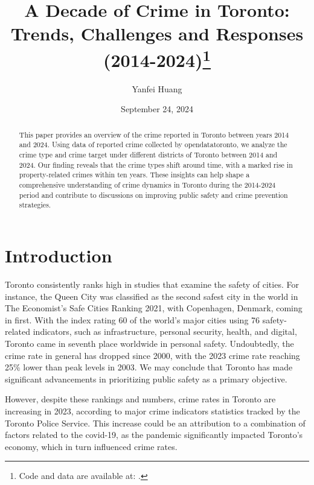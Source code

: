 \documentclass[
  letterpaper,
  DIV=11,
  numbers=noendperiod]{scrartcl}
\title{A Decade of Crime in Toronto: Trends, Challenges and Responses
(2014-2024)\thanks{Code and data are available at: .}}
\author{Yanfei Huang}
\date{September 24, 2024}
\begin{document}
\maketitle
\begin{abstract}
This paper provides an overview of the crime reported in Toronto between
years 2014 and 2024. Using data of reported crime collected by
opendatatoronto, we analyze the crime type and crime target under
different districts of Toronto between 2014 and 2024. Our finding
reveals that the crime types shift around time, with a marked rise in
property-related crimes within ten years. These insights can help shape
a comprehensive understanding of crime dynamics in Toronto during the
2014-2024 period and contribute to discussions on improving public
safety and crime prevention strategies.
\end{abstract}
\ifdefined\Shaded\renewenvironment{Shaded}{\begin{tcolorbox}[borderline west={3pt}{0pt}{shadecolor}, frame hidden, interior hidden, sharp corners, enhanced, breakable, boxrule=0pt]}{\end{tcolorbox}}\fi

\hypertarget{introduction}{%
\section{Introduction}\label{introduction}}

Toronto consistently ranks high in studies that examine the safety of
cities. For instance, the Queen City was classified as the second safest
city in the world in The Economist's Safe Cities Ranking 2021, with
Copenhagen, Denmark, coming in first. With the index rating 60 of the
world's major cities using 76 safety-related indicators, such as
infrastructure, personal security, health, and digital, Toronto came in
seventh place worldwide in personal safety. Undoubtedly, the crime rate
in general has dropped since 2000, with the 2023 crime rate reaching
25\% lower than peak levels in 2003. We may conclude that Toronto has
made significant advancements in prioritizing public safety as a primary
objective.

However, despite these rankings and numbers, crime rates in Toronto are
increasing in 2023, according to major crime indicators statistics
tracked by the Toronto Police Service. This increase could be an
attribution to a combination of factors related to the covid-19, as the
pandemic significantly impacted Toronto's economy, which in turn
influenced crime rates.
\end{document}
